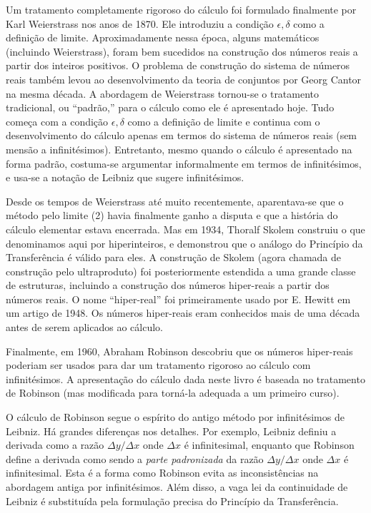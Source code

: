 Um tratamento completamente rigoroso do cálculo foi formulado finalmente
por Karl Weierstrass nos anos de 1870. Ele introduziu a condição
$\epsilon,\delta$ como a definição de limite. Aproximadamente nessa
época, alguns matemáticos (incluindo Weierstrass), foram bem sucedidos
na construção dos números reais a partir dos inteiros positivos. O
problema de construção do sistema de números reais também levou ao
desenvolvimento da teoria de conjuntos por Georg Cantor na mesma
década. A abordagem de Weierstrass tornou-se o tratamento tradicional,
ou ``padrão,'' para o cálculo como ele é apresentado hoje. Tudo começa
com a condição $\epsilon,\delta$ como a definição de limite e continua
com o desenvolvimento do cálculo apenas em termos do sistema de
números reais (sem mensão a infinitésimos). Entretanto, mesmo quando
o cálculo é apresentado na forma padrão, costuma-se argumentar
informalmente em termos de infinitésimos, e usa-se a notação de
Leibniz que sugere infinitésimos.

Desde os tempos de Weierstrass até muito recentemente, aparentava-se
que o método pelo limite (2) havia finalmente ganho a disputa e
que a história do cálculo elementar estava encerrada. Mas em 1934,
Thoralf Skolem construiu o que denominamos aqui por hiperinteiros,
e demonstrou que o análogo do Princípio da Transferência é válido para
eles. A construção de Skolem (agora chamada de construção pelo
ultraproduto) foi posteriormente estendida a uma grande classe de
estruturas, incluindo a construção dos números hiper-reais a partir
dos números reais. O nome ``hiper-real'' foi primeiramente usado por
E. Hewitt em um artigo de 1948. Os números hiper-reais eram conhecidos
mais de uma década antes de serem aplicados ao cálculo.

Finalmente, em 1960, Abraham Robinson descobriu que os números hiper-reais
poderiam ser usados para dar um tratamento rigoroso ao cálculo com
infinitésimos. A apresentação do cálculo dada neste livro é baseada
no tratamento de Robinson (mas modificada para torná-la adequada a um
primeiro curso).

O cálculo de Robinson segue o espírito do antigo método por infinitésimos
de Leibniz. Há grandes diferenças nos detalhes. Por exemplo, Leibniz
definiu a derivada como a razão $\Delta y / \Delta x$ onde $\Delta x$
é infinitesimal, enquanto que Robinson define a derivada como sendo
a \emph{parte padronizada} da razão $\Delta y / \Delta x$ onde $\Delta x$
é infinitesimal. Esta é a forma como Robinson evita as inconsistências
na abordagem antiga por infinitésimos. Além disso, a vaga lei da
continuidade de Leibniz é substituída pela formulação precisa do
Princípio da Transferência.

